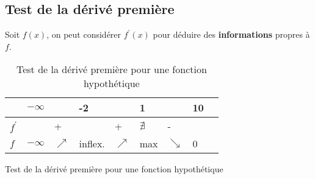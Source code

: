\documentclass{report}
\begin{document}
\begin{multicols*}{3}
    \section{Test de la dérivé première}
    Soit $f\left(x\right)$, on peut considérer $f^{\prime}(x)$ 
    pour déduire des \textbf{informations} propres à $f$.   

    \begin{table}[H]
    \centering

      \caption {Test de la dérivé première pour une fonction hypothétique}

    \begin{adjustbox}{width=0.33\textwidth}
        \renewcommand{\arraystretch}{1.5}
        \selectfont
        \begin{tabular}{|l|l|l|l|l|l|l|l|l}
        \arrayrulecolor{blue}\hline
        \rowcolor{lightBlue}
        \textcolor{myb}{} & \textcolor{myb}{ $-\infty$ } & & -2 & & 1 & & 10
        \\
        \hline
        \hline
        \arrayrulecolor{black} 
        $f^{\prime} $ &  & + &  & + & $\nexists$  & - & 
        \\ 
        \hline 
        $f$ & $-\infty$  & $\nearrow$ & inflex. & 
        $\nearrow$ & max & $\searrow$ & 0 
        \\ 
        \hline
      \end{tabular}
    \end{adjustbox}
    \end{table}
    

    \begin{table}[h]
      \caption {Test de la dérivé première pour une fonction hypothétique}


\end{table}
\end{multicols*}
\end{document}
